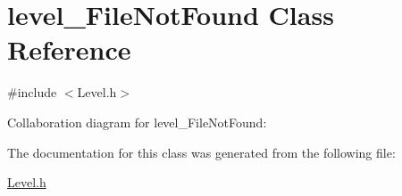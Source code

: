 \hypertarget{classlevel___file_not_found}{}\section{level\+\_\+\+File\+Not\+Found Class Reference}
\label{classlevel___file_not_found}


{\ttfamily \#include $<$Level.\+h$>$}



Collaboration diagram for level\+\_\+\+File\+Not\+Found\+:


The documentation for this class was generated from the following file\+:\begin{DoxyCompactItemize}
\item 
\hyperlink{_level_8h}{Level.\+h}\end{DoxyCompactItemize}
